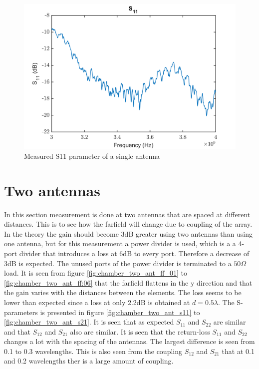 \begin{figure}[H]
\centering 
\includegraphics[scale = 0.8]{figures/measurement/antennas/spar_single_ant_s11.png}
\caption{Measured S11 parameter of a single antenna}
\label{fig:chamber_s11}
\end{figure} 

\section{Two antennas}
In this section measurement is done at two antennas that are spaced at different distances. This is to see how the farfield will change due to coupling of the array. In the theory the gain should become 3dB greater using two antennas than using one antenna, but for this measurement a power divider is used, which is a a 4-port divider that introduces a loss at 6dB to every port. Therefore a decrease of 3dB is expected. The unused ports of the power divider is terminated to a $50\Omega$ load. It is seen from figure \ref{fig:chamber_two_ant_ff_01} to \ref{fig:chamber_two_ant_ff:06} that the farfield flattens in the y direction and that the gain varies with the distances between the elements. The loss seems to be lower than expected since a loss at only 2.2dB is obtained at $d=0.5\lambda$. The S-parameters is presented in figure \ref{fig:chamber_two_ant_s11} to \ref{fig:chamber_two_ant_s21}. It is seen that as expected $S_{11}$ and $S_{22}$ are similar and that $S_{12}$ and $S_{21}$ also are similar. It is seen that the return-loss $S_{11}$ and $S_{22}$ changes a lot with the spacing of the antennas. The largest difference is seen from 0.1 to 0.3 wavelengths. This is also seen from the coupling $S_{12}$ and $S_{21}$ that at 0.1 and 0.2 wavelengths ther is a large amount of coupling. 

